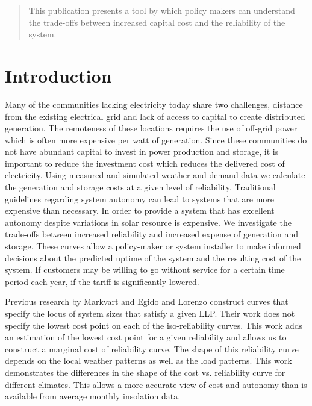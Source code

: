 \documentclass{article}
\begin{document}
\begin{abstract}
This publication presents a tool by which policy makers can
understand the trade-offs between increased capital cost and the
reliability of the system.
\end{abstract}

\section{Introduction}
Many of the communities lacking electricity today share two challenges,
distance from the existing electrical grid and lack of access to capital
to create distributed generation.
The remoteness of these locations requires the use of off-grid power
which is often more expensive per watt of generation.
Since these communities do not have abundant capital to invest in power
production and storage, it is important to reduce the investment cost
which reduces the delivered cost of electricity.
Using measured and simulated weather and demand data we calculate the
generation and storage costs at a given level of reliability.
Traditional guidelines regarding system autonomy can lead to systems
that are more expensive than necessary.
In order to provide a system that has excellent autonomy despite
variations in solar resource is expensive.
We investigate the trade-offs between increased reliability and
increased expense of generation and storage.
These curves allow a policy-maker or system installer to make informed
decisions about the predicted uptime of the system and the resulting
cost of the system.
If customers may be willing to go without service for a certain time period
each year, if the tariff is significantly lowered.

Previous research by Markvart and Egido and Lorenzo construct curves
that specify the locus of system sizes that satisfy a given LLP.
Their work does not specify the lowest cost point on each of the
iso-reliability curves.
This work adds an estimation of the lowest cost point for a given
reliability and allows us to construct a marginal cost of reliability
curve.
The shape of this reliability curve depends on the local weather
patterns as well as the load patterns.
This work demonstrates the differences in the shape of the cost vs.
reliability curve for different climates.
This allows a more accurate view of cost and autonomy than is available
from average monthly insolation data.
\end{document}
